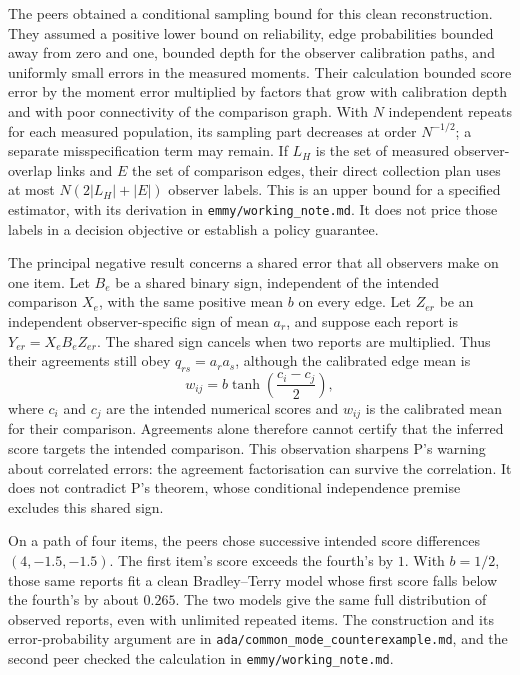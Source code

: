 \documentclass{article}
\begin{document}
The peers obtained a conditional sampling bound for this clean reconstruction. They assumed a positive lower
bound on reliability, edge probabilities bounded away from zero and one, bounded depth for the observer
calibration paths, and uniformly small errors in the measured moments. Their calculation bounded score error
by the moment error multiplied by factors that grow with calibration depth and with poor connectivity of the
comparison graph. With \(N\) independent repeats for each measured population, its sampling part decreases at
order \(N^{-1/2}\); a separate misspecification term may remain. If \(L_H\) is the set of measured
observer-overlap links and \(E\) the set of comparison edges, their direct collection plan uses at most
\(N(2|L_H|+|E|)\) observer labels. This is an upper bound for a specified estimator, with its derivation in
\texttt{emmy/working\_note.md}. It does not price those labels in a decision objective or establish a policy
guarantee.

The principal negative result concerns a shared error that all observers make on one item. Let \(B_e\) be a
shared binary sign, independent of the intended comparison \(X_e\), with the same positive mean \(b\) on every
edge. Let \(Z_{er}\) be an independent observer-specific sign of mean \(a_r\), and suppose each report is
\(Y_{er}=X_eB_eZ_{er}\). The shared sign cancels when two reports are multiplied. Thus their agreements still
obey \(q_{rs}=a_ra_s\), although the calibrated edge mean is
\[
w_{ij}=b\tanh\!\left(\frac{c_i-c_j}{2}\right),
\]
where \(c_i\) and \(c_j\) are the intended numerical scores and \(w_{ij}\) is the calibrated mean for their
comparison. Agreements alone therefore cannot certify that the inferred score targets the intended comparison.
This observation sharpens P's warning about correlated errors: the agreement factorisation can survive the
correlation. It does not contradict P's theorem, whose conditional independence premise excludes this shared
sign.

On a path of four items, the peers chose successive intended score differences \((4,-1.5,-1.5)\). The first
item's score exceeds the fourth's by \(1\). With \(b=1/2\), those same reports fit a clean Bradley--Terry
model whose first score falls below the fourth's by about \(0.265\). The two models give the same full
distribution of observed reports, even with unlimited repeated items. The construction and its
error-probability argument are in \texttt{ada/common\_mode\_counterexample.md}, and the second peer checked
the calculation in \texttt{emmy/working\_note.md}.
\end{document}
